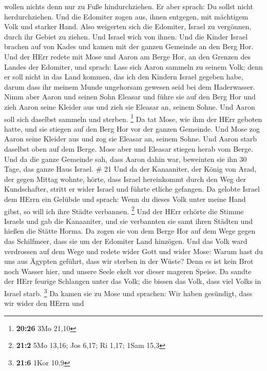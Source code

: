 wollen nichts denn nur zu Fuße hindurchziehen.  Er aber
sprach: Du sollst nicht herdurchziehen. Und die Edomiter zogen aus,
ihnen entgegen, mit mächtigem Volk und starker Hand.  Also
weigerten sich die Edomiter, Israel zu vergönnen, durch ihr Gebiet zu
ziehen. Und Israel wich von ihnen.  Und die Kinder Israel
brachen auf von Kades und kamen mit der ganzen Gemeinde an den Berg Hor.
 Und der HErr redete mit Mose und Aaron am Berge Hor, an
den Grenzen des Landes der Edomiter, und sprach:  Lass sich
Aaron sammeln zu seinem Volk; denn er soll nicht in das Land kommen, das
ich den Kindern Israel gegeben habe, darum dass ihr meinem Munde
ungehorsam gewesen seid bei dem Haderwasser.  Nimm aber
Aaron und seinen Sohn Eleasar und führe sie auf den Berg Hor
 und zieh Aaron seine Kleider aus und zieh sie Eleasar an,
seinem Sohne. Und Aaron soll sich daselbst sammeln und sterben.
\footnote{\textbf{20:26} 3Mo 21,10}  Da tat Mose, wie ihm
der HErr geboten hatte, und sie stiegen auf den Berg Hor vor der ganzen
Gemeinde.  Und Mose zog Aaron seine Kleider aus und zog sie
Eleasar an, seinem Sohne. Und Aaron starb daselbst oben auf dem Berge.
Mose aber und Eleasar stiegen herab vom Berge.  Und da die
ganze Gemeinde sah, dass Aaron dahin war, beweinten sie ihn 30 Tage, das
ganze Haus Israel. \# 21  Und da der Kanaaniter, der König
von Arad, der gegen Mittag wohnte, hörte, dass Israel hereinkommt durch
den Weg der Kundschafter, stritt er wider Israel und führte etliche
gefangen.  Da gelobte Israel dem HErrn ein Gelübde und
sprach: Wenn du dieses Volk unter meine Hand gibst, so will ich ihre
Städte verbannen. \footnote{\textbf{21:2} 5Mo 13,16; Jos 6,17; Ri 1,17;
  1Sam 15,3}  Und der HErr erhörte die Stimme Israels und
gab die Kanaaniter, und sie verbannten sie samt ihren Städten und hießen
die Stätte Horma.  Da zogen sie von dem Berge Hor auf dem
Wege gegen das Schilfmeer, dass sie um der Edomiter Land hinzögen. Und
das Volk ward verdrossen auf dem Wege  und redete wider Gott
und wider Mose: Warum hast du uns aus Ägypten geführt, dass wir sterben
in der Wüste? Denn es ist kein Brot noch Wasser hier, und unsere Seele
ekelt vor dieser mageren Speise.  Da sandte der HErr feurige
Schlangen unter das Volk; die bissen das Volk, dass viel Volks in Israel
starb. \footnote{\textbf{21:6} 1Kor 10,9}  Da kamen sie zu
Mose und sprachen: Wir haben gesündigt, dass wir wider den HErrn und
